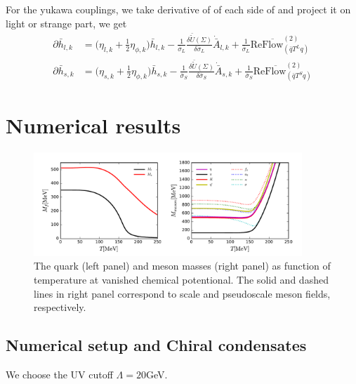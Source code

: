 \documentclass[%
reprint,
superscriptaddress,
showpacs,preprintnumbers,
amsmath,amssymb,
aps,
prd,
]{revtex4-1}
\def\Eq#1{\Cref{#1}}
\begin{document}
For the yukawa couplings, we take derivative of of each side of \Eq{Wettericheq} and project it on light or strange part, we get
\begin{align}
\partial \bar h_{l,k}&=\bigg( \eta_{l,k} +\frac{1}{2}\eta_{\phi,k}\bigg ) \bar h_{l,k}-\frac{1}{\bar \sigma_L} \frac{\delta \bar{\tilde U}(\Sigma)}{\delta \bar \sigma_L}\dot{\bar A}_{l,k}+\frac{1}{\bar \sigma_L} \text{Re} \overline{  \text{Flow} }_{(\bar q T^L q)}^{(2)}\\
\partial \bar h_{s,k}&=\bigg( \eta_{s,k} +\frac{1}{2}\eta_{\phi,k}\bigg ) \bar h_{s,k}-\frac{1}{\bar \sigma_S} \frac{\delta \bar{\tilde U}(\Sigma)}{\delta \bar \sigma_S}\dot{\bar A}_{s,k}+\frac{1}{\bar \sigma_S} \text{Re} \overline{  \text{Flow} }_{(\bar q T^S q)}^{(2)} \label{Yukawa_eq}
\end{align}

	
\section{Numerical results}
\label{sec:result}

%
\begin{figure}[t]
\includegraphics[width=0.9\textwidth]{MFMBO}
\caption{The quark (left panel) and  meson masses (right panel) as function of temperature at vanished chemical potentional. The solid and dashed lines in right panel correspond to scale and pseudoscale meson fields, respectively.}\label{fig:MFMBO}
\end{figure}
%

\subsection{Numerical setup and Chiral condensates}
We choose the UV cutoff $\Lambda=20$GeV.
\end{document}
